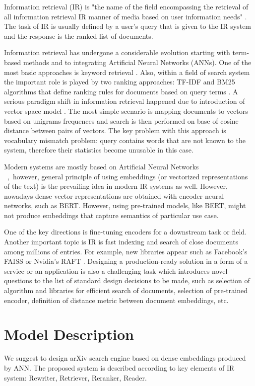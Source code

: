 \documentclass{article}
\begin{document}
    Information retrieval (IR) is "the name of the field encompassing the retrieval of all information retrieval IR manner of media based on user information needs" \cite{jurafsky}. The task of IR is usually defined by a user's query that is given to the IR system and the response is the ranked list of documents. 

    Information retrieval has undergone a considerable evolution starting with term-based methods and to integrating Artificial Neural Networks (ANNs). One of the most basic approaches is keyword retrieval \cite{salton1988term}. Also, within a field of search system the important role is played by two ranking approaches: TF-IDF and BM25 algorithms that define ranking rules for documents based on query terms \cite{robertson1995okapi}. A serious paradigm shift in information retrieval happened due to introduction of vector space model \cite{salton1975vector}. The most simple scenario is mapping documents to vectors based on unigrams frequences and search is then performed on base of cosine distance between pairs of vectors. The key problem with this approach is vocabulary mismatch problem: query contains words that are not known to the system, therefore their statistics become unusable in this case. 
    
    Modern systems are mostly based on Artificial Neural Networks \\ \cite{lin2022pretrained}~,~however, general principle of using embeddings (or vectorized representations of the text) is the prevailing idea in modern IR systems as well. However, nowadays dense vector representations are obtained with encoder neural networks, such as BERT. However, using pre-trained models, like BERT, might not produce embeddings that capture semantics of particular use case. 
    
    One of the key directions is fine-tuning encoders for a downstream task or field. Another important topic is IR is fast indexing and search of close documents among millions of entries. For example, new libraries appear such as Facebook's FAISS \cite{faiss} or Nvidia's RAFT \cite{raft}. Designing a production-ready solution in a form of a service or an application is also a challenging task which introduces novel questions to the list of standard design decisions to be made, such as selection of algorithm and libraries for efficient search of documents, selection of pre-trained encoder, definition of distance metric between document embeddings, etc. 

\section{Model Description}\label{sec:methodology}
    We suggest to design arXiv search engine based on dense embeddings produced by ANN. The proposed system is described according to key elements of IR system: Rewriter, Retriever, Reranker, Reader.
    
\end{document}
